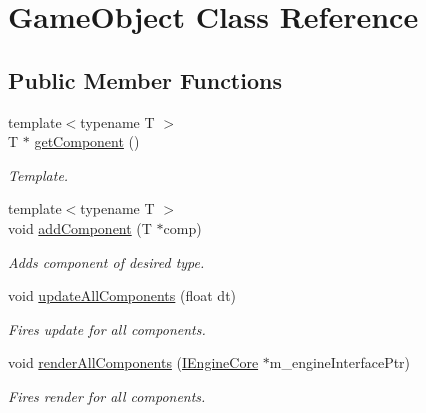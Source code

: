 \hypertarget{class_game_object}{\section{Game\+Object Class Reference}
\label{class_game_object}
}
\subsection*{Public Member Functions}
\begin{DoxyCompactItemize}
\item 
{\footnotesize template$<$typename T $>$ }\\T $\ast$ \hyperlink{class_game_object_a1c50376c7f24439359a3962f57dfd513}{get\+Component} ()
\begin{DoxyCompactList}\small\item\em Template. \end{DoxyCompactList}\item 
\hypertarget{class_game_object_aff400b6c6e3c6af0b42fe49adb786174}{{\footnotesize template$<$typename T $>$ }\\void \hyperlink{class_game_object_aff400b6c6e3c6af0b42fe49adb786174}{add\+Component} (T $\ast$comp)}\label{class_game_object_aff400b6c6e3c6af0b42fe49adb786174}

\begin{DoxyCompactList}\small\item\em Adds component of desired type. \end{DoxyCompactList}\item 
\hypertarget{class_game_object_a9f4d3988cee6c0dd1a2846d92265359e}{void \hyperlink{class_game_object_a9f4d3988cee6c0dd1a2846d92265359e}{update\+All\+Components} (float dt)}\label{class_game_object_a9f4d3988cee6c0dd1a2846d92265359e}

\begin{DoxyCompactList}\small\item\em Fires update for all components. \end{DoxyCompactList}\item 
\hypertarget{class_game_object_a3e93bca635ff45cef4f4853545c1b2c4}{void \hyperlink{class_game_object_a3e93bca635ff45cef4f4853545c1b2c4}{render\+All\+Components} (\hyperlink{class_i_engine_core}{I\+Engine\+Core} $\ast$m\+\_\+engine\+Interface\+Ptr)}\label{class_game_object_a3e93bca635ff45cef4f4853545c1b2c4}

\begin{DoxyCompactList}\small\item\em Fires render for all components. \end{DoxyCompactList}\end{DoxyCompactItemize}
